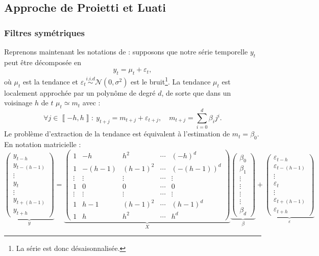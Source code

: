 \documentclass[
  11pt,
  french,
  a4paper]{article}
\newcommand\1{\mathds{1}}
\begin{document}
\hypertarget{sec-proietti}{%
\subsection{Approche de Proietti et Luati}\label{sec-proietti}}

\hypertarget{filtres-symuxe9triques}{%
\subsubsection{Filtres symétriques}\label{filtres-symuxe9triques}}

Reprenons maintenant les notations de \textcite{proietti2008} : supposons que notre série temporelle \(y_t\) peut être décomposée en
\[
y_t=\mu_t+\varepsilon_t,
\]
où \(\mu_t\) est la tendance et \(\varepsilon_{t}\overset{i.i.d}{\sim}\mathcal{N}(0,\sigma^{2})\) est le bruit\footnote{La série est donc désaisonnalisée.}.
La tendance \(\mu_t\) est localement approchée par un polynôme de degré \(d\), de sorte que dans un voisinage \(h\) de \(t\) \(\mu_t\simeq m_{t}\) avec :
\[
\forall j\in\left\llbracket -h,h\right\rrbracket :\:
y_{t+j}=m_{t+j}+\varepsilon_{t+j},\quad m_{t+j}=\sum_{i=0}^{d}\beta_{i}j^{i}.
\]
Le problème d'extraction de la tendance est équivalent à l'estimation de \(m_t=\beta_0\).
En notation matricielle :
\[
\underbrace{\begin{pmatrix}y_{t-h}\\
y_{t-(h-1)}\\
\vdots\\
y_{t}\\
\vdots\\
y_{t+(h-1)}\\
y_{t+h}
\end{pmatrix}}_{y}=\underbrace{\begin{pmatrix}1 & -h & h^{2} & \cdots & (-h)^{d}\\
1 & -(h-1) & (h-1)^{2} & \cdots & (-(h-1))^{d}\\
\vdots & \vdots & \vdots & \cdots & \vdots\\
1 & 0 & 0 & \cdots & 0\\
\vdots & \vdots & \vdots & \cdots & \vdots\\
1 & h-1 & (h-1)^{2} & \cdots & (h-1)^{d}\\
1 & h & h^{2} & \cdots & h^{d}
\end{pmatrix}}_{X}\underbrace{\begin{pmatrix}\beta_{0}\\
\beta_{1}\\
\vdots\\
\vdots\\
\vdots\\
\vdots\\
\beta_{d}
\end{pmatrix}}_{\beta}+\underbrace{\begin{pmatrix}\varepsilon_{t-h}\\
\varepsilon_{t-(h-1)}\\
\vdots\\
\varepsilon_{t}\\
\vdots\\
\varepsilon_{t+(h-1)}\\
\varepsilon_{t+h}
\end{pmatrix}}_{\varepsilon}
\]
\end{document}
